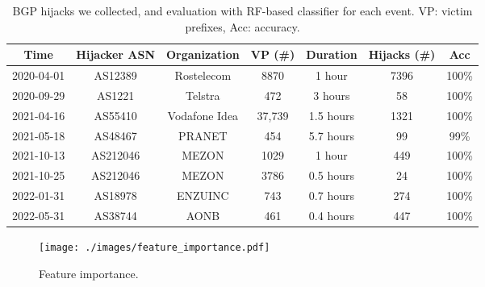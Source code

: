  \begin{table}[t!]
  
  \centering
  \fontsize{5}{5}\selectfont %
  \renewcommand\arraystretch{0.9}{
  \begin {tabular}{ccccccc}
  \toprule
    \textbf{Time} & \textbf{Hijacker ASN} & \textbf{Organization} & \textbf{VP (\#)} & \textbf{Duration} & \textbf{Hijacks (\#)} & \textbf{Acc} \\
    \midrule
   2020-04-01 & AS12389 & Rostelecom & 8870 & 1 hour & 7396 & 100\% \\
   2020-09-29 & AS1221 & Telstra & 472 & 3 hours & 58 & 100\% \\
   2021-04-16 & AS55410 & Vodafone Idea & 37,739 & 1.5 hours & 1321 & 100\% \\
   2021-05-18 & AS48467 & PRANET  & 454 & 5.7 hours & 99 & 99\% \\
  2021-10-13 & AS212046 & MEZON & 1029 & 1 hour & 449 & 100\% \\
   2021-10-25 & AS212046 & MEZON & 3786 & 0.5 hours & 24 & 100\%  \\ 
   2022-01-31 & AS18978 & ENZUINC & 743 & 0.7 hours & 274 & 100\%\\
   2022-05-31 & AS38744 & AONB & 461 & 0.4 hours & 447 & 100\% \\
   \bottomrule
   \end{tabular}
   }
   \caption[Statistics of BGP hijacks collected.]{\small{BGP hijacks we collected, and evaluation with RF-based classifier for each event. VP: victim prefixes, Acc: accuracy.}}
\label{tab:bgp_incidents_res}
\vspace{-15pt}
\end{table}

\begin{figure}[b!]
\centerline{\texttt{[image: ./images/feature\_importance.pdf]}}
\vspace{-10pt}
\caption{\small{Feature importance.}}
\label{fig:lov_feature_importance}
\end{figure}

\vspace{-8pt}
